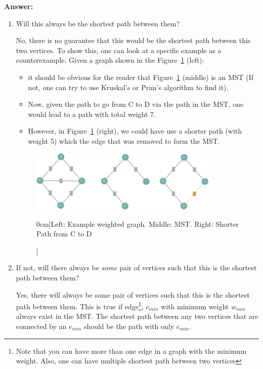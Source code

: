 \documentclass[nobib]{tufte-handout}
\newcounter{counter}
\begin{document}
\textbf{Answer:} \\ 
\begin{enumerate}
    \item Will this always be the shortest path between them?
    
    No, there is no guarantee that this would be the shortest path between this two vertices. To show this, one can look at a specific example as a counterexample. Given a graph shown in the Figure~\ref{fig:ex4_full} (left):
    \begin{itemize}
        \item it should be obvious for the reader that Figure~\ref{fig:ex4_full} (middle) is an MST (If not, one can try to use Kruskal's or Prim's algorithm to find it).
        \item Now, given the path to go from C to D via the path in the MST, one would lead to a path with total weight 7.
        \item However, in Figure~\ref{fig:ex4_full} (right), we could have use a shorter path (with weight 5) which the edge that was removed to form the MST.  
    \end{itemize}  
    
\begin{figure}
  \centering
  \includegraphics[width=0.85\textwidth]{graphics/L6_prim_kruskal_dijkstra/ex4_full.png}
  \caption[][0cm]{Left: Example weighted graph. Middle: MST. Right: Shorter Path from C to D}
  \label{fig:ex4_full}
\end{figure}

    \item If not, will there always be \emph{some} pair of vertices such that this is the shortest path between them?
    
    Yes, there will always be some pair of vertices such that this is the shortest path between them. This is true if edge\footnote{Note that you can have more than one edge in a graph with the minimum weight. Also, one can have multiple shortest path between two vertices}, $e_{min}$ with minimum weight $w_{min}$ always exist in the MST. The shortest path between any two vertices that are connected by an $e_{min}$ should be the path with only $e_{min}$.
    

\end{enumerate}
\end{document}

